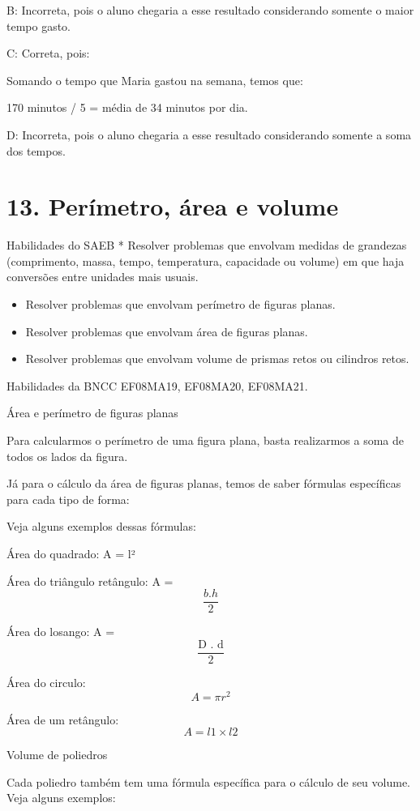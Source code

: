B: Incorreta, pois o aluno chegaria a esse resultado considerando
somente o maior tempo gasto.

C: Correta, pois:

Somando o tempo que Maria gastou na semana, temos que:

170 minutos / 5 = média de 34 minutos por dia.

D: Incorreta, pois o aluno chegaria a esse resultado considerando
somente a soma dos tempos.


\section{13. Perímetro, área e
volume}

Habilidades do SAEB * Resolver problemas que envolvam medidas de
grandezas (comprimento, massa, tempo, temperatura, capacidade ou volume)
em que haja conversões entre unidades mais usuais.

\begin{itemize}
\item
  Resolver problemas que envolvam perímetro de figuras planas.
\item
  Resolver problemas que envolvam área de figuras planas.
\item
  Resolver problemas que envolvam volume de prismas retos ou cilindros
  retos.
\end{itemize}

Habilidades da BNCC EF08MA19, EF08MA20, EF08MA21.

Área e perímetro de figuras planas

Para calcularmos o perímetro de uma figura plana, basta realizarmos a
soma de todos os lados da figura.

Já para o cálculo da área de figuras planas, temos de saber fórmulas
específicas para cada tipo de forma:

Veja alguns exemplos dessas fórmulas:

Área do quadrado: A = l²

Área do triângulo retângulo: A = \[\frac{b.h}{2}\]

Área do losango: A = \[\frac{\text{D . d}}{2}\]

Área do circulo: \[A = \pi r^{2}\]

Área de um retângulo: \[A = l1 \times l2\]

Volume de poliedros

Cada poliedro também tem uma fórmula específica para o cálculo de seu
volume. Veja alguns exemplos:

